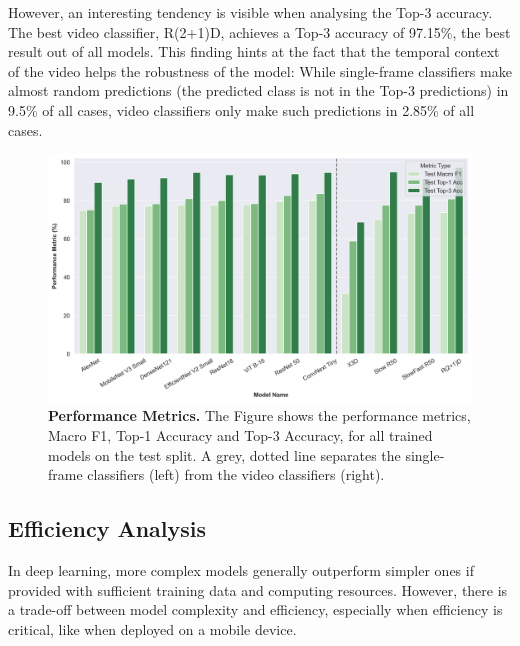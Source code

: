 \documentclass[a4paper]{article}
\begin{document}
However, an interesting tendency is visible when analysing the Top-3 accuracy.
The best video classifier, R(2+1)D, achieves a Top-3 accuracy of 97.15\%, the
best result out of all models. This finding hints at the fact that the temporal
context of the video helps the robustness of the model: While single-frame
classifiers make almost random predictions (the predicted class is not in the
Top-3 predictions) in 9.5\% of all cases, video classifiers only make such
predictions in 2.85\% of all cases.



\begin{figure}
  \begin{center}
    \includegraphics[width=.95\textwidth]
    {./figures/performance-metrics.png}
  \end{center}

  \caption{\textbf{Performance Metrics.} The Figure shows the performance
  metrics, Macro F1, Top-1 Accuracy and Top-3 Accuracy, for all trained models
on the test split. A grey, dotted line separates the single-frame classifiers
(left) from the video classifiers (right).}

  \label{fig:performance-metrics}
\end{figure}

\subsection{Efficiency Analysis} %
\label{sub:efficiency}

In deep learning, more complex models generally outperform simpler ones if
provided with sufficient training data and computing resources. However, there
is a trade-off between model complexity and efficiency, especially when
efficiency is critical, like when deployed on a mobile device.
\end{document}
